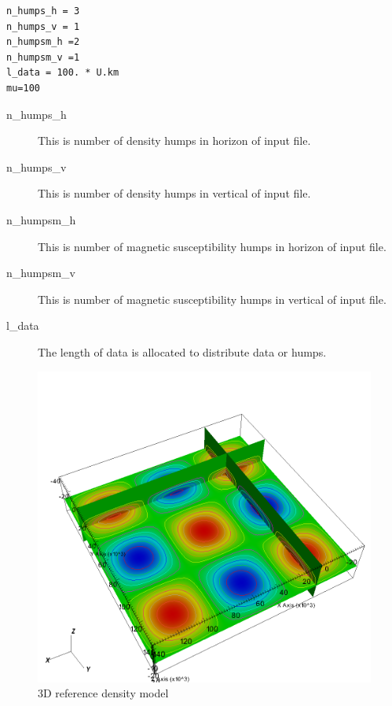 \begin{verbatim}
n_humps_h = 3
n_humps_v = 1
n_humpsm_h =2
n_humpsm_v =1
l_data = 100. * U.km
mu=100
\end{verbatim}

\begin{description} 	
\item[n_humps_h]This is number of density humps in horizon of input file.

\item[n_humps_v]This is number of density humps in vertical of input file.

\item[n_humpsm_h]This is number of magnetic susceptibility humps in horizon of input file.

\item[n_humpsm_v]This is number of magnetic susceptibility humps in vertical of input file.

\item[l_data]The length of data is allocated to distribute data or humps.

\end{description}


\begin{figure}
\centering
\includegraphics[width=\textwidth]{joint3D4mag6grav-gref.png}
\caption{3D reference density model}
\label{fig:joint3D4mag6grav-gref}
\end{figure}


